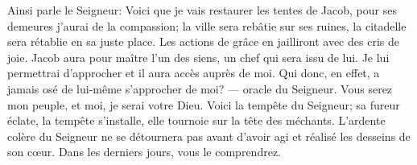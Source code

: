 Ainsi parle le Seigneur:
	Voici que je vais restaurer les tentes de Jacob,
	pour ses demeures j’aurai de la compassion;
	la ville sera rebâtie sur ses ruines, la citadelle sera rétablie en sa juste place.
Les actions de grâce en jailliront avec des cris de joie.
Jacob aura pour maître l’un des siens, un chef qui sera issu de lui.
	Je lui permettrai d’approcher et il aura accès auprès de moi.
Qui donc, en effet, a jamais osé de lui-même s’approcher de moi?
	--- oracle du Seigneur.
Vous serez mon peuple, et moi, je serai votre Dieu.
Voici la tempête du Seigneur;
	sa fureur éclate, la tempête s’installe, elle tournoie sur la tête des méchants.
L’ardente colère du Seigneur ne se détournera pas avant d’avoir agi
	et réalisé les desseins de son cœur.
	Dans les derniers jours, vous le comprendrez.

